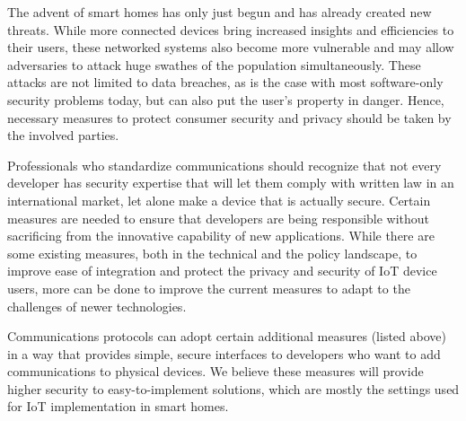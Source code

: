 The advent of smart homes has only just begun and has already created new threats. While more connected devices bring increased insights and efficiencies to their users, these networked systems also become more vulnerable and may allow adversaries to attack huge swathes of the population simultaneously. These attacks are not limited to data breaches, as is the case with most software-only security problems today, but can also put the user’s property in danger. Hence, necessary measures to protect consumer security and privacy should be taken by the involved parties.

Professionals who standardize communications should recognize that not every developer has security expertise that will let them comply with written law in an international market, let alone make a device that is actually secure. Certain measures are needed to ensure that developers are being responsible without sacrificing from the innovative capability of new applications. While there are some existing measures, both in the technical and the policy landscape, to improve ease of integration and protect the privacy and security of IoT device users, more can be done to improve the current measures to adapt to the challenges of newer technologies.

Communications protocols can adopt certain additional measures (listed above) in a way that provides simple, secure interfaces to developers who want to add communications to physical devices. We believe these measures will provide higher security to easy-to-implement solutions, which are mostly the settings used for IoT implementation in smart homes. 
